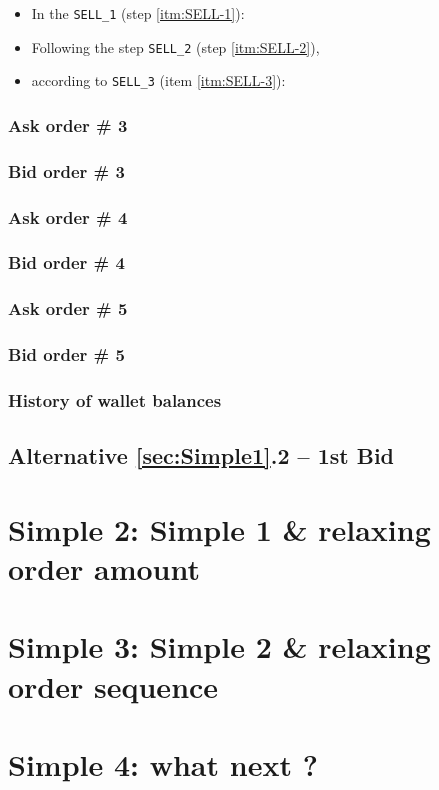 \documentclass[a4paper,11pt]{article}
\begin{document}
\begin{itemize}
    \item  In the {\tt SELL\_1} (step \ref{itm:SELL-1}):
    	
    \item Following the step {\tt SELL\_2} (step \ref{itm:SELL-2}), 
	
    \item according to {\tt SELL\_3} (item \ref{itm:SELL-3}):

\end{itemize}

	
\subsubsection{Ask order \# 3} 
	
\subsubsection{Bid order \# 3} 
	
\subsubsection{Ask order \# 4}
	
\subsubsection{Bid order \# 4}
	
\subsubsection{Ask order \# 5} 
	
\subsubsection{Bid order \# 5} 
	
\subsubsection{History of wallet balances} 

\subsection{Alternative \ref{sec:Simple1}.2 -- 1st Bid}




\section{Simple 2: Simple 1 \& relaxing order amount}
\section{Simple 3: Simple 2 \& relaxing order sequence}
\section{Simple 4: what next ?}
\end{document}
